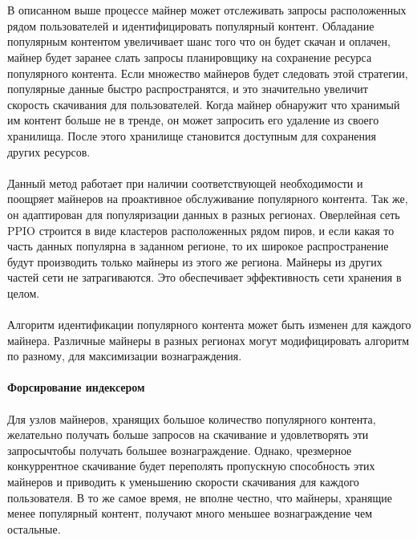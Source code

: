 \documentclass[10pt,a4paper]{article}
\begin{document}
\vspace{-0.5em}
\\ \\В описанном выше процессе майнер может отслеживать запросы расположенных рядом пользователей и идентифицировать популярный контент. Обладание популярным контентом увеличивает шанс того что он будет скачан и оплачен, майнер будет заранее слать запросы планировщику на сохранение ресурса популярного контента. Если множество майнеров будет следовать этой стратегии, популярные данные быстро распространятся, и это значительно увеличит скорость скачивания для пользователей. Когда майнер обнаружит что хранимый им контент больше не в тренде, он может запросить его удаление из своего хранилища. После этого хранилище становится доступным для сохранения других ресурсов.
\vspace{-0.5em}
\\ \\Данный метод работает при наличии соответствующей необходимости и поощряет майнеров на проактивное обслуживание популярного контента. Так же, он адаптирован для популяризации данных в разных регионах. Оверлейная сеть PPIO строится в виде кластеров расположенных рядом пиров, и если какая то часть данных популярна в заданном регионе, то их широкое распространение будут производить только майнеры из этого же региона. Майнеры из других частей сети не затрагиваются. Это обеспечивает эффективность сети хранения в целом.
\vspace{-0.5em}
\\ \\Алгоритм идентификации популярного контента может быть изменен для каждого майнера. Различные майнеры в разных регионах могут модифицировать алгоритм по разному, для максимизации вознаграждения.
\vspace{-0.5em}
\\ \\{\bf Форсирование индексером}
\vspace{-0.5em}
\\ \\Для узлов майнеров, хранящих большое количество популярного контента, желательно получать больше запросов на скачивание и удовлетворять эти запросычтобы получать большее вознаграждение. Однако, чрезмерное конкуррентное скачивание будет переполять пропускную способность этих майнеров и приводить к уменьшению скорости скачивания для каждого пользователя. В то же самое время, не вполне честно, что майнеры, хранящие менее популярный контент, получают много меньшее вознаграждение чем остальные.
\end{document}
